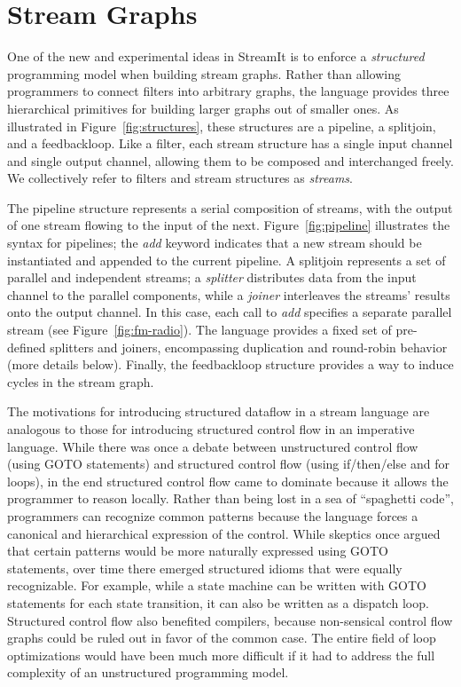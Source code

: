 \section{Stream Graphs}

One of the new and experimental ideas in StreamIt is to enforce a {\it
  structured} programming model when building stream graphs.  Rather
than allowing programmers to connect filters into arbitrary graphs,
the language provides three hierarchical primitives for building
larger graphs out of smaller ones.  As illustrated in
Figure~\ref{fig:structures}, these structures are a pipeline, a
splitjoin, and a feedbackloop.  Like a filter, each stream structure
has a single input channel and single output channel, allowing them to
be composed and interchanged freely.  We collectively refer to filters
and stream structures as {\it streams}.

The pipeline structure represents a serial composition of streams,
with the output of one stream flowing to the input of the next.
Figure~\ref{fig:pipeline} illustrates the syntax for pipelines; the
{\it add} keyword indicates that a new stream should be instantiated
and appended to the current pipeline.  A splitjoin represents a set of
parallel and independent streams; a {\it splitter} distributes data
from the input channel to the parallel components, while a {\it
  joiner} interleaves the streams' results onto the output channel.
In this case, each call to {\it add} specifies a separate parallel
stream (see Figure~\ref{fig:fm-radio}).  The language provides a fixed
set of pre-defined splitters and joiners, encompassing duplication and
round-robin behavior (more details below).  Finally, the feedbackloop
structure provides a way to induce cycles in the stream graph.


The motivations for introducing structured dataflow in a stream
language are analogous to those for introducing structured control
flow in an imperative language.  While there was once a debate between
unstructured control flow (using GOTO statements) and structured
control flow (using if/then/else and for loops), in the end structured
control flow came to dominate because it allows the programmer to
reason locally.  Rather than being lost in a sea of ``spaghetti
code'', programmers can recognize common patterns because the language
forces a canonical and hierarchical expression of the control.  While
skeptics once argued that certain patterns would be more naturally
expressed using GOTO statements, over time there emerged structured
idioms that were equally recognizable.  For example, while a state
machine can be written with GOTO statements for each state transition,
it can also be written as a dispatch loop.  Structured control flow
also benefited compilers, because non-sensical control flow graphs
could be ruled out in favor of the common case.  The entire field of
loop optimizations would have been much more difficult if it had to
address the full complexity of an unstructured programming model.

